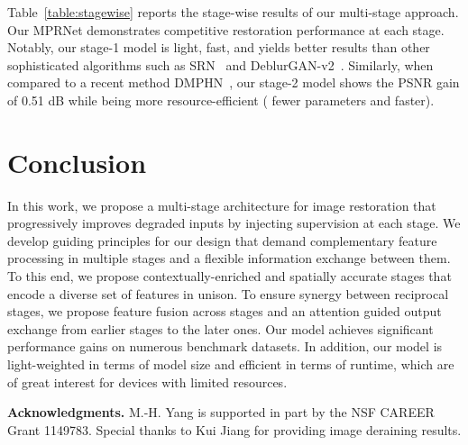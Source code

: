\documentclass[10pt,twocolumn,letterpaper]{article}
\begin{document}
\begin{table}[!t]
\begin{center}
\caption{\small Stage-wise deblurring performance of MPRNet on GoPro~\cite{gopro2017}. 
Runtimes are computed with the Nvidia Titan Xp GPU. }
\label{table:stagewise}
\vspace{-2mm}
\setlength{\tabcolsep}{1.7pt}
\end{center}\vspace{-1.8em}
\end{table}


Table~\ref{table:stagewise} reports the stage-wise results of our multi-stage approach.
Our MPRNet demonstrates competitive restoration performance at each stage. 
Notably, our stage-1 model is light, fast, and yields better results than other sophisticated algorithms such as SRN~\cite{tao2018scale} and DeblurGAN-v2~\cite{deblurganv2}.
Similarly, when compared to a recent method DMPHN~\cite{dmphn2019}, our stage-2 model shows the PSNR gain of 0.51 dB while being more resource-efficient ( fewer parameters and  faster). 

\section{Conclusion}
In this work, we propose a multi-stage architecture for image restoration that progressively improves degraded inputs by injecting supervision at each stage. We develop guiding principles for our design that demand complementary feature processing in multiple stages and a flexible information exchange between them. To this end, we propose contextually-enriched and spatially accurate stages that encode a diverse set of features in unison. To ensure synergy between reciprocal stages, we propose feature fusion across stages and an attention guided output exchange from earlier stages to the later ones. Our model achieves significant performance gains on numerous benchmark datasets. In addition, our model is light-weighted in terms of model size and efficient in terms of runtime, which are of great interest for devices with limited resources. 


\vspace{0.5em}\noindent\textbf{Acknowledgments.} M.-H. Yang is supported in part by the NSF CAREER Grant 1149783. Special thanks to Kui Jiang for providing image deraining results. 


{\small


}
\end{document}
